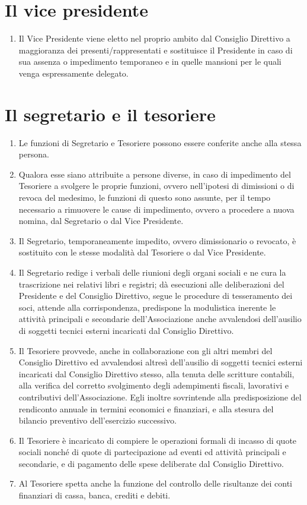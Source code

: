 \documentclass{djtsdoc}
\begin{document}
	\section{Il vice presidente}
	\begin{enumerate}
		\item Il Vice Presidente viene eletto nel proprio ambito dal Consiglio Direttivo a maggioranza dei presenti/rappresentati e sostituisce il Presidente in caso di sua assenza o impedimento temporaneo e in quelle mansioni per le quali venga espressamente delegato.
	\end{enumerate}
	
	\section{Il segretario e il tesoriere}
	\begin{enumerate}
		\item Le funzioni di Segretario e Tesoriere possono essere conferite anche alla stessa persona.
		\item Qualora esse siano attribuite a persone diverse, in caso di impedimento del Tesoriere a svolgere le proprie funzioni, ovvero nell'ipotesi di dimissioni o di revoca del medesimo, le funzioni di questo sono assunte, per il tempo necessario a rimuovere le cause di impedimento, ovvero a procedere a nuova nomina, dal Segretario o dal Vice Presidente.
		\item Il Segretario, temporaneamente impedito, ovvero dimissionario o revocato, è sostituito con le stesse modalità dal Tesoriere o dal Vice Presidente.
		\item Il Segretario redige i verbali delle riunioni degli organi sociali e ne cura la trascrizione nei relativi libri e registri; dà esecuzioni alle deliberazioni del Presidente e del Consiglio Direttivo, segue le procedure di tesseramento dei soci,  attende alla corrispondenza, predispone la modulistica inerente  le attività principali e secondarie dell'Associazione anche avvalendosi dell'ausilio di soggetti tecnici esterni incaricati dal Consiglio Direttivo.
		\item Il Tesoriere provvede, anche in collaborazione con gli altri membri del Consiglio Direttivo ed avvalendosi altresì dell'ausilio di soggetti tecnici esterni incaricati dal Consiglio Direttivo stesso, alla tenuta delle scritture contabili, alla verifica del corretto svolgimento degli adempimenti fiscali, lavorativi e contributivi dell'Associazione. Egli inoltre sovrintende alla predisposizione del rendiconto annuale in termini economici e finanziari, e alla stesura del bilancio preventivo dell'esercizio successivo.
		\item Il Tesoriere è incaricato di compiere le operazioni formali di incasso di quote sociali nonché di quote di partecipazione ad eventi ed attività principali e secondarie, e di pagamento delle spese deliberate dal Consiglio Direttivo.
		\item Al Tesoriere spetta anche la funzione del controllo delle risultanze dei conti finanziari di cassa, banca, crediti e debiti.
	\end{enumerate}
	
\end{document}
